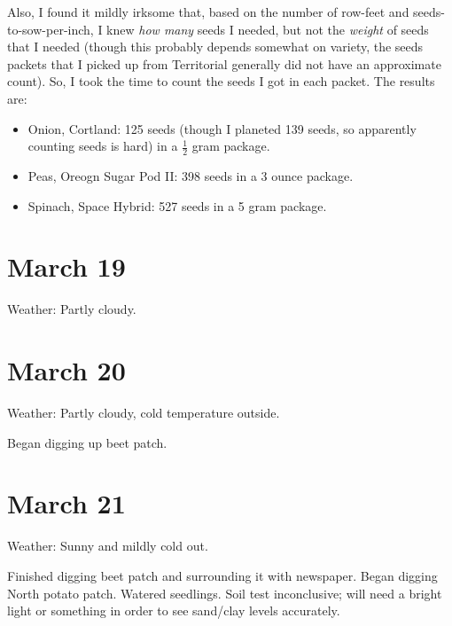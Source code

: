 \documentclass{article}
\begin{document}
Also, I found it mildly irksome that, based on the number of row-feet and seeds-to-sow-per-inch, I knew \textit{how many} seeds I needed, but not the \textit{weight} of seeds that I needed (though this probably depends somewhat on variety, the seeds packets that I picked up from Territorial generally did not have an approximate count). So, I took the time to count the seeds I got in each packet. The results are:
\begin{itemize}
	\item Onion, Cortland: 125 seeds (though I planeted 139 seeds, so apparently counting seeds is hard) in a $\frac{1}{2}$ gram package.
	\item Peas, Oreogn Sugar Pod II: 398 seeds in a 3 ounce package.
	\item Spinach, Space Hybrid: 527 seeds in a 5 gram package.
\end{itemize}

\section*{March 19}
Weather: Partly cloudy.

\section*{March 20}
Weather: Partly cloudy, cold temperature outside.

Began digging up beet patch.

\section*{March 21}
Weather: Sunny and mildly cold out.

Finished digging beet patch and surrounding it with newspaper. Began digging North potato patch. Watered seedlings. Soil test inconclusive; will need a bright light or something in order to see sand/clay levels accurately.
\end{document}
